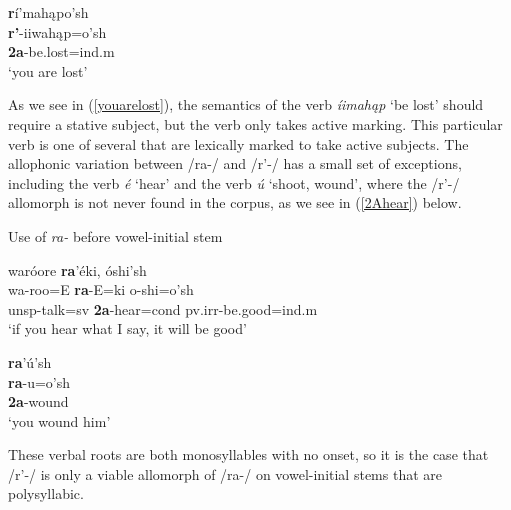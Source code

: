 \begin{exe}
\begin{xlist}
	\item\label{youarelost} \glll \textbf{r}í'mahąpo'sh\\
	\textbf{r'}-iiwahąp=o'sh\\
	\textbf{2a}-\textnormal{be.lost}=ind.m\\
	\glt `you are lost' \citep[96]{hollow1970}
	

	
	\end{xlist}

\end{exe}

As we see in (\ref{youarelost}), the semantics of the verb \textit{íimahąp} `be lost' should require a stative subject, but the verb only takes active marking. This particular verb is one of several that are lexically marked to take active subjects. The allophonic variation between /ra-/ and /r'-/ has a small set of exceptions, including the verb \textit{é} `hear' and the verb \textit{ú} `shoot, wound', where the /r'-/ allomorph is not never found in the corpus, as we see in (\ref{2Ahear}) below.

\begin{exe}
\item\label{2Ahear} Use of \textit{ra-} before vowel-initial stem 

	\begin{xlist}
	
	\item \glll waróore \textbf{ra}'éki, óshi'sh\\
	wa-roo=E \textbf{ra}-E=ki o-shi=o'sh\\
	unsp-\textnormal{talk}=sv \textbf{2a}-\textnormal{hear}=cond pv.irr-\textnormal{be.good}=ind.m\\
	\glt `if you hear what I say, it will be good' \citep[240]{hollow1973b}
	
	\item \glll \textbf{ra}'ú'sh\\
	\textbf{ra}-u=o'sh\\
	\textbf{2a}-\textnormal{wound}\\
	\glt `you wound him'
	
	\end{xlist}
	
\end{exe}

These verbal roots are both monosyllables with no onset, so it is the case that /r'-/ is only a viable allomorph of /ra-/ on vowel-initial stems that are polysyllabic.


